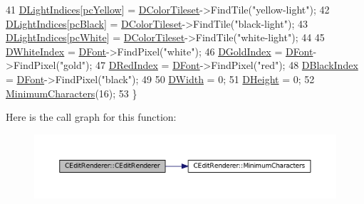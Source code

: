 \begin{DoxyCode}
41     \hyperlink{classCEditRenderer_aa1d5d41e26d759abd3ff5ba8edc4d692}{DLightIndices}[\hyperlink{GameDataTypes_8h_aafb0ca75933357ff28a6d7efbdd7602fabe29a0eabd9c2d47ac0179eb5b252c34}{pcYellow}] = \hyperlink{classCEditRenderer_a43dfa83f85527019c7499e33ecaed149}{DColorTileset}->FindTile(\textcolor{stringliteral}{"yellow-light"});
42     \hyperlink{classCEditRenderer_aa1d5d41e26d759abd3ff5ba8edc4d692}{DLightIndices}[\hyperlink{GameDataTypes_8h_aafb0ca75933357ff28a6d7efbdd7602fa9ae67c5388342a6ed3f5f2e2c09acce9}{pcBlack}] = \hyperlink{classCEditRenderer_a43dfa83f85527019c7499e33ecaed149}{DColorTileset}->FindTile(\textcolor{stringliteral}{"black-light"});
43     \hyperlink{classCEditRenderer_aa1d5d41e26d759abd3ff5ba8edc4d692}{DLightIndices}[\hyperlink{GameDataTypes_8h_aafb0ca75933357ff28a6d7efbdd7602fa3cbd8201421af4b5b5993c7a6847f1bc}{pcWhite}] = \hyperlink{classCEditRenderer_a43dfa83f85527019c7499e33ecaed149}{DColorTileset}->FindTile(\textcolor{stringliteral}{"white-light"});
44     
45     \hyperlink{classCEditRenderer_aaa97fde55438f6ad02cbb365097a2274}{DWhiteIndex} = \hyperlink{classCEditRenderer_afd108ae6cb3e9eeffce881a1ada0f0db}{DFont}->FindPixel(\textcolor{stringliteral}{"white"});
46     \hyperlink{classCEditRenderer_adef6e0cd1cc67b18a196bbac95a7306b}{DGoldIndex} = \hyperlink{classCEditRenderer_afd108ae6cb3e9eeffce881a1ada0f0db}{DFont}->FindPixel(\textcolor{stringliteral}{"gold"});
47     \hyperlink{classCEditRenderer_a77ce4df48e03a8b9245f2045c2c3c4e7}{DRedIndex} = \hyperlink{classCEditRenderer_afd108ae6cb3e9eeffce881a1ada0f0db}{DFont}->FindPixel(\textcolor{stringliteral}{"red"});
48     \hyperlink{classCEditRenderer_a13b03f02ff6673d8df2d6509c17bcccc}{DBlackIndex} = \hyperlink{classCEditRenderer_afd108ae6cb3e9eeffce881a1ada0f0db}{DFont}->FindPixel(\textcolor{stringliteral}{"black"});
49     
50     \hyperlink{classCEditRenderer_ab203e5083f61d3575eb491f170c21d45}{DWidth} = 0;
51     \hyperlink{classCEditRenderer_ade8dedb4f9790d28b38da8ef20a171cb}{DHeight} = 0;
52     \hyperlink{classCEditRenderer_a36726cc31fedec0820076c03186158e7}{MinimumCharacters}(16);
53 \}
\end{DoxyCode}
Here is the call graph for this function\+:\nopagebreak
\begin{figure}[H]
\begin{center}
\leavevmode
\includegraphics[width=350pt]{classCEditRenderer_a672139544dacbe5fb75dd30663a0bc0b_cgraph}
\end{center}
\end{figure}


